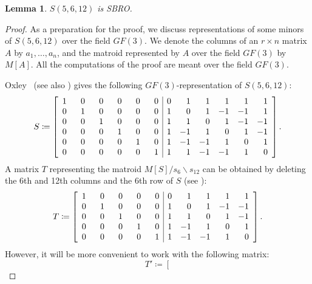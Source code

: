 \documentclass[11pt,a4paper]{article}
\theoremstyle{plain}
\newtheorem{lem}[thm]{Lemma}
\theoremstyle{definition}
\begin{document}
\begin{lem}\label{lem:issbro}
    $S(5,6,12)$ is SBRO.
\end{lem}
\begin{proof} 
As a preparation for the proof, we discuss representations of some minors of $S(5,6,12)$ over the field $GF(3)$. We denote the columns of an $r \times n$ matrix $A$ by $a_1, \dots, a_n$, and the matroid represented by $A$ over the field $GF(3)$ by $M[A]$. All the computations of the proof are meant over the field $GF(3)$.

Oxley~\cite{oxley1987characterization} (see also \cite[page 658]{oxley2011matroid}) gives the following $GF(3)$-representation of $S(5,6,12)$:
\begin{equation*}
S \coloneqq \left[\begin{array}{*{6}r|*{6}r}
    1 & ~~0 & ~~0 & ~~0 & ~~0 & ~~0 &    0 &  1 & 1  &  1 &  1 & 1 \\
    0 & 1 & 0 & 0 & 0 & 0 &    1 &  0 & 1  & -1 & -1 & 1 \\
    0 & 0 & 1 & 0 & 0 & 0 &    1 &  1 & 0  &  1 & -1 & -1 \\
    0 & 0 & 0 & 1 & 0 & 0 &    1 & -1 & 1  &  0 &  1 & -1 \\
    0 & 0 & 0 & 0 & 1 & 0 &    1 & -1 & -1 &  1 &  0 & 1 \\
    0 & 0 & 0 & 0 & 0 & 1 &    1 &  1 & -1 & -1 &  1 & 0
\end{array}\right].
\end{equation*}
A matrix $T$ representing the matroid $M[S] / s_6 \backslash s_{12}$ 
can be obtained by deleting the 6th and 12th columns and the 6th row of $S$ (see \cite[Proposition 3.2.6]{oxley2011matroid}):
\begin{equation*}
T \coloneqq \left[
\begin{array}{*{5}r|*{5}r}
1 & ~~0 & ~~0 & ~~0 & ~~0   & 0 &  1 &  1 &  1 &  1 \\
0 & 1 & 0 & 0 & 0   & 1 &  0 &  1 & -1 & -1 \\
0 & 0 & 1 & 0 & 0   & 1 &  1 &  0 &  1 & -1 \\
0 & 0 & 0 & 1 & 0   & 1 & -1 &  1 &  0 &  1 \\
0 & 0 & 0 & 0 & 1   & 1 & -1 & -1 &  1 &  0  
\end{array}
\right].
\end{equation*}
However, it will be more convenient to work with the following matrix:
\begin{equation*}
T' \coloneqq \left[

\end{equation*}
\end{proof}
\end{document}
